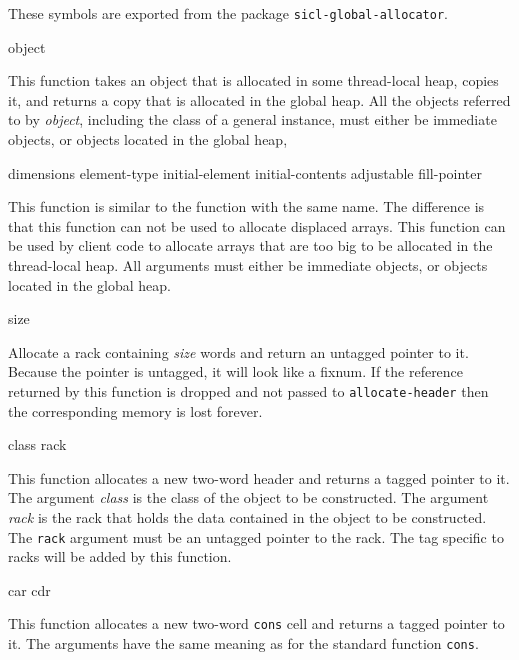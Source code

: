 These symbols are exported from the package
\texttt{sicl-global-allocator}.

 {object}

This function takes an object that is allocated in some thread-local
heap, copies it, and returns a copy that is allocated in the global
heap.  All the objects referred to by \textit{object}, including the
class of a general instance, must either be immediate objects, or
objects located in the global heap,

 {dimensions \key element-type initial-element
  initial-contents adjustable fill-pointer}

This function is similar to the \commonlisp{} function with the same
name.  The difference is that this function can not be used to
allocate displaced arrays.  This function can be used by client code
to allocate arrays that are too big to be allocated in the
thread-local heap.  All arguments must either be immediate objects, or
objects located in the global heap.


 {size}

Allocate a rack containing \textit{size} words and return an untagged
pointer to it.  Because the pointer is untagged, it will look like a
fixnum.  If the reference returned by this function is dropped and not
passed to \texttt{allocate-header} then the corresponding memory is
lost forever.


 {class rack}

This function allocates a new two-word header and returns a tagged
pointer to it.  The argument \textit{class} is the class of the object
to be constructed.  The argument \textit{rack} is the rack that holds
the data contained in the object to be constructed.  The \texttt{rack}
argument must be an untagged pointer to the rack.  The tag specific to
racks will be added by this function.

 {car cdr}

This function allocates a new two-word \texttt{cons} cell and returns
a tagged pointer to it.  The arguments have the same meaning as for
the standard \commonlisp{} function \texttt{cons}.

